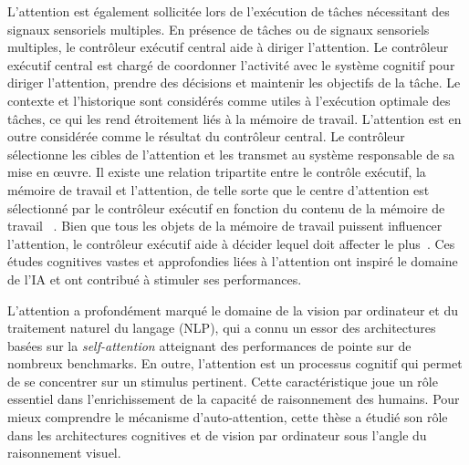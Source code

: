 L'attention est \'egalement sollicit\'ee lors de l'ex\'ecution de tâches n\'ecessitant des signaux sensoriels multiples. En pr\'esence de tâches ou de signaux sensoriels multiples, le contrôleur ex\'ecutif central aide \`a diriger l'attention. Le contrôleur ex\'ecutif central est charg\'e de coordonner l'activit\'e avec le syst\`eme cognitif pour diriger l'attention, prendre des d\'ecisions et maintenir les objectifs de la tâche. Le contexte et l'historique sont consid\'er\'es comme utiles \`a l'ex\'ecution optimale des tâches, ce qui les rend \'etroitement li\'es \`a la m\'emoire de travail. L'attention est en outre consid\'er\'ee comme le r\'esultat du contrôleur central. Le contrôleur s\'electionne les cibles de l'attention et les transmet au syst\`eme responsable de sa mise en œuvre. Il existe une relation tripartite entre le contrôle ex\'ecutif, la m\'emoire de travail et l'attention, de telle sorte que le centre d'attention est s\'electionn\'e par le contrôleur ex\'ecutif en fonction du contenu de la m\'emoire de travail ~\citep{soto2008automatic}. Bien que tous les objets de la m\'emoire de travail puissent influencer l'attention, le contrôleur ex\'ecutif aide \`a d\'ecider lequel doit affecter le plus~\citep{olivers2011difference}. Ces \'etudes cognitives vastes et approfondies li\'ees \`a l'attention ont inspir\'e le domaine de l'IA et ont contribu\'e \`a stimuler ses performances.

L'attention a profond\'ement marqué le domaine de la vision par ordinateur et du traitement naturel du langage (NLP), qui a connu un essor des architectures bas\'ees sur la \textit{self-attention} atteignant des performances de pointe sur de nombreux benchmarks. En outre, l'attention est un processus cognitif qui permet de se concentrer sur un stimulus pertinent. Cette caract\'eristique joue un rôle essentiel dans l'enrichissement de la capacit\'e de raisonnement des humains. Pour mieux comprendre le m\'ecanisme d'auto-attention, cette th\`ese a \'etudi\'e son rôle dans les architectures cognitives et de vision par ordinateur sous l'angle du raisonnement visuel.    

